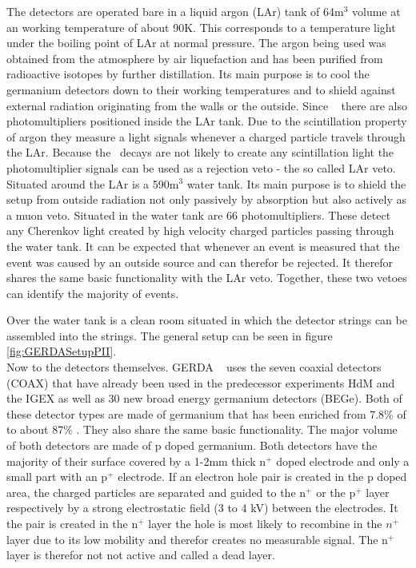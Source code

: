 \documentclass[encoding=utf8,british]{tumphthesis}
\begin{document}
The detectors are operated bare in a liquid argon (LAr) tank of 64m$^3$ volume at an working temperature of about 90K.
This corresponds to a temperature light under the boiling point of LAr at normal pressure.
The argon being used was obtained from the atmosphere by air liquefaction and has been purified from radioactive isotopes by further distillation.
Its main purpose is to cool the germanium detectors down to their working temperatures and to shield against external radiation originating from the walls or the outside. 
Since \PII~ there are also photomultipliers positioned inside the LAr tank.
Due to the scintillation property of argon they measure a light signals whenever a charged particle travels through the LAr.
Because the \onbb\ decays are not likely to create any scintillation light the photomultiplier signals can be used as a rejection veto - the so called LAr veto.
\\

Situated around the LAr is a 590m$^3$ water tank.
Its main purpose is to shield the setup from outside radiation not only passively by absorption but also actively as a muon veto.
Situated in the water tank are 66 photomultipliers.
These detect any Cherenkov light created by high velocity charged particles passing through the water tank.
It can be expected that whenever an event is measured that the event was caused by an outside source and can therefor be rejected.
It therefor shares the same basic functionality with the LAr veto.   
Together, these two vetoes can identify  the majority of events.


Over the water tank is a clean room situated in which the detector strings can be assembled into the strings.  
The general setup can be seen in figure \ref{fig:GERDASetupPII}.
\\

Now to the detectors themselves.
GERDA \PII~ uses the seven coaxial detectors (COAX) that have already been used in the predecessor experiments HdM and the IGEX as well as 30 new broad energy germanium detectors (BEGe).
Both of these detector types are made of germanium that has been enriched from 7.8$\%$ of  to about 87$\%$ \cite{agostini_background_2017}.
They also share the same basic functionality.
The major volume of both detectors are made of p doped germanium.
Both detectors have the majority of their surface covered by a 1-2mm thick n$^+$ doped electrode and only a small part with an p$^+$ electrode.
If an electron hole pair is created in the p doped area, the charged particles are separated and guided to the n$^+$ or the p$^+$ layer respectively by a strong electrostatic field (3 to 4 kV) between the electrodes.
It the pair is created in the n$^+$ layer the hole is most likely to recombine in the $n^+$ layer due to its low mobility and therefor creates no measurable signal.
The n$^+$ layer is therefor not not active and called a dead layer.
\\
\end{document}
